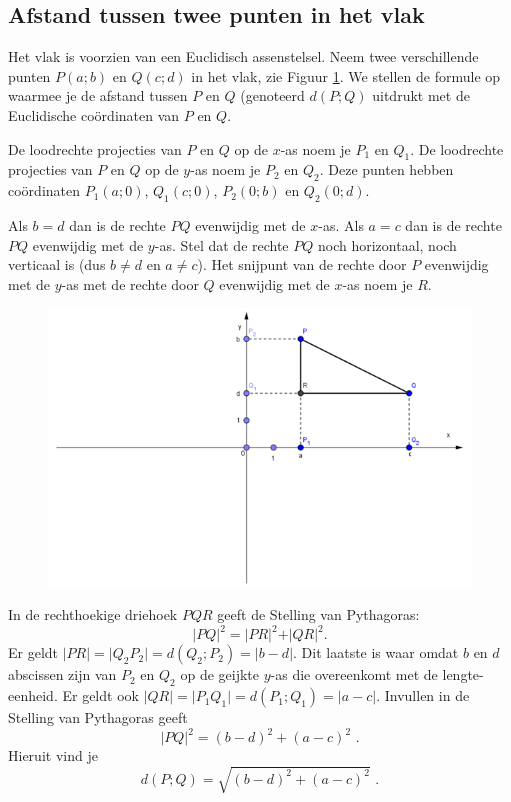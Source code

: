 \subsection{Afstand tussen twee punten in het vlak}
\noindent

Het vlak is voorzien van een Euclidisch assenstelsel.
Neem twee verschillende punten $P(a;b)$ en $Q(c;d)$ in het vlak, zie Figuur \ref{fig4.2.3_fig1}.
We stellen de formule op waarmee je de afstand tussen $P$ en $Q$ (genoteerd $d(P;Q)$ uitdrukt met de Euclidische co\"ordinaten van $P$ en $Q$.

De loodrechte projecties van $P$ en $Q$ op de $x$-as noem je $P_1$ en $Q_1$.
De loodrechte projecties van $P$ en $Q$ op de $y$-as noem je $P_2$ en $Q_2$.
Deze punten hebben co\"ordinaten $P_1(a;0)$, $Q_1(c;0)$, $P_2(0;b)$ en $Q_2(0;d)$.

Als $b=d$ dan is de rechte $PQ$ evenwijdig met de $x$-as.
Als $a=c$ dan is de rechte $PQ$ evenwijdig met de $y$-as.
Stel dat de rechte $PQ$ noch horizontaal, noch verticaal is (dus $b\neq d$ en $a \neq c$).
Het snijpunt van de rechte door $P$ evenwijdig met de $y$-as met de rechte door $Q$ evenwijdig met de $x$-as noem je $R$.

\begin{figure}[!htb]
\begin{center}
\includegraphics[width=.7\linewidth]{4_opp_inhoud_an_meetk/inputs/AMTekst3Fig1}
\caption{}
\label{fig4.2.3_fig1}
\end{center}
\end{figure}

In de rechthoekige driehoek $PQR$ geeft de Stelling van Pythagoras:
\[
\vert PQ \vert ^2= \vert PR \vert ^2+ \vert QR \vert ^2 \text {.}
\]
Er geldt $\vert PR \vert = \vert Q_2P_2 \vert = d(Q_2;P_2)=\vert b-d \vert$.
Dit laatste is waar omdat $b$ en $d$ abscissen zijn van $P_2$ en $Q_2$ op de geijkte $y$-as die overeenkomt met de lengte-eenheid.
Er geldt ook $\vert QR \vert = \vert P_1Q_1 \vert = d(P_1;Q_1)=\vert a-c \vert$.
Invullen in de Stelling van Pythagoras geeft
\[
\vert PQ \vert ^2=(b-d)^2+(a-c)^2 \text{ .}
\]
Hieruit vind je
\[
d(P;Q)=\sqrt{(b-d)^2+(a-c)^2} \text { .}
\]\vspace{2mm}

